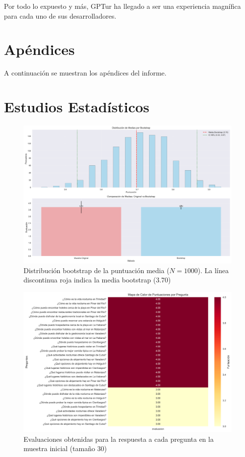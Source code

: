 \documentclass[10pt]{llncs}
\begin{document}
Por todo lo expuesto y más, GPTur ha llegado a ser una experiencia magnífica para cada uno de sus desarrolladores.

\vspace{\baselineskip}
\printbibliography

\newpage
\section*{Apéndices}
A continuación se muestran los apéndices del informe.
\appendix

\section{Estudios Estadísticos}

\begin{figure}
\centering
\includegraphics[width=1\textwidth]{../src/experiments/one_only_agent/bootstrap_distribution_20250617-171514.png}
\caption{Distribución bootstrap de la puntuación media ($N=1000$). La línea discontinua roja indica la media bootstrap (3.70)}
\label{fig:boot_dist_1}
\end{figure}

\begin{figure}
\centering
\includegraphics[width=1\textwidth]{../src/experiments/one_only_agent/quality_heatmap_20250617-171514.png}
\caption{Evaluaciones obtenidas para la respuesta a cada pregunta en la muestra inicial (tamaño 30)}
\label{fig:eval_1}
\end{figure}
\end{document}
